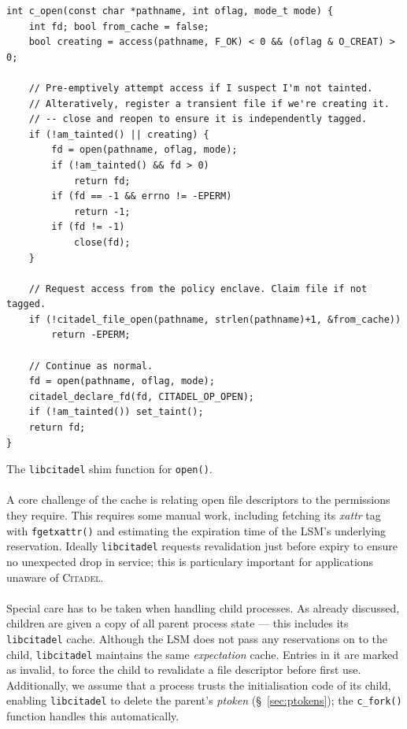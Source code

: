 \begin{listing}
\begin{verbatim}
int c_open(const char *pathname, int oflag, mode_t mode) {
    int fd; bool from_cache = false;
    bool creating = access(pathname, F_OK) < 0 && (oflag & O_CREAT) > 0;
    
    // Pre-emptively attempt access if I suspect I'm not tainted.
    // Alteratively, register a transient file if we're creating it.
    // -- close and reopen to ensure it is independently tagged.
    if (!am_tainted() || creating) {
        fd = open(pathname, oflag, mode);
        if (!am_tainted() && fd > 0)
            return fd;
        if (fd == -1 && errno != -EPERM)
            return -1;
        if (fd != -1)
            close(fd);
    }

    // Request access from the policy enclave. Claim file if not tagged.
    if (!citadel_file_open(pathname, strlen(pathname)+1, &from_cache))
        return -EPERM;

    // Continue as normal.
    fd = open(pathname, oflag, mode);
    citadel_declare_fd(fd, CITADEL_OP_OPEN);
    if (!am_tainted()) set_taint();
    return fd;
}
\end{verbatim}
\caption{The \texttt{libcitadel} shim function for \texttt{open()}.}
\label{lst:c_open}
\end{listing}

\paragraph{} A core challenge of the cache is relating open file descriptors to the permissions they require. This requires some manual work, including fetching its \textit{xattr} tag with \texttt{fgetxattr()} and estimating the expiration time of the LSM's underlying reservation. Ideally \texttt{libcitadel} requests revalidation just before expiry to ensure no unexpected drop in service; this is particulary important for applications unaware of \textsc{Citadel}.

\paragraph{} Special care has to be taken when handling child processes. As already discussed, children are given a copy of all parent process state --- this includes its \texttt{libcitadel} cache. Although the LSM does not pass any reservations on to the child, \texttt{libcitadel} maintains the same \textit{expectation} cache. Entries in it are marked as invalid, to force the child to revalidate a file descriptor before first use. Additionally, we assume that a process trusts the initialisation code of its child, enabling \texttt{libcitadel} to delete the parent's \textit{ptoken} (§~\ref{sec:ptokens}); the \texttt{c\_fork()} function handles this automatically.


